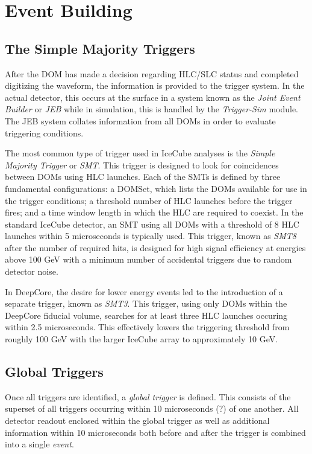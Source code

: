 \section{Event Building}
\subsection{The Simple Majority Triggers}
After the DOM has made a decision regarding HLC/SLC status and completed digitizing the waveform, the information is provided to the trigger system.
In the actual detector, this occurs at the surface in a system known as the \emph{Joint Event Builder} or \emph{JEB} while in simulation, this is handled by the \emph{Trigger-Sim} module. 
The JEB system collates information from all DOMs in order to evaluate triggering conditions.

The most common type of trigger used in IceCube analyses is the \emph{Simple Majority Trigger} or \emph{SMT}. 
This trigger is designed to look for coincidences between DOMs using HLC launches.
Each of the SMTs is defined by three fundamental configurations: a DOMSet, which lists the DOMs available for use in the trigger conditions; a threshold number of HLC launches before the trigger fires; and a time window length in which the HLC are required to coexist.
In the standard IceCube detector, an SMT using all DOMs with a threshold of 8 HLC launches within 5 microseconds is typically used.
This trigger, known as \emph{SMT8} after the number of required hits, is designed for high signal efficiency at energies above 100 GeV with a minimum number of accidental triggers due to random detector noise.

In DeepCore, the desire for lower energy events led to the introduction of a separate trigger, known as \emph{SMT3}.
This trigger, using only DOMs within the DeepCore fiducial volume, searches for at least three HLC launches occuring within 2.5 microseconds.
This effectively lowers the triggering threshold from roughly 100 GeV with the larger IceCube array to approximately 10 GeV.

\subsection{Global Triggers}
Once all triggers are identified, a \emph{global trigger} is defined. 
This consists of the superset of all triggers occurring within 10 microseconds (?) of one another.
All detector readout enclosed within the global trigger as well as additional information within 10 microseconds both before and after the trigger is combined into a single \emph{event}.